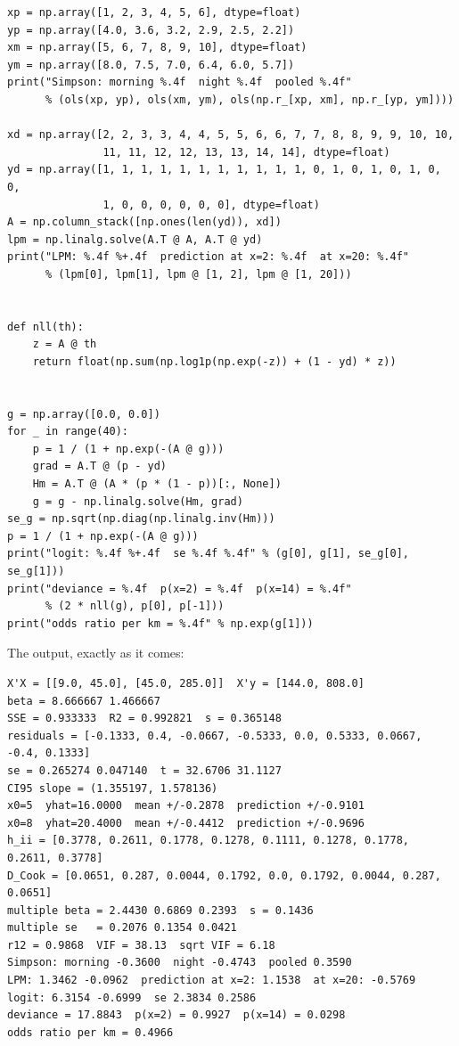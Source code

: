\begin{lab}
\begin{verbatim}
xp = np.array([1, 2, 3, 4, 5, 6], dtype=float)
yp = np.array([4.0, 3.6, 3.2, 2.9, 2.5, 2.2])
xm = np.array([5, 6, 7, 8, 9, 10], dtype=float)
ym = np.array([8.0, 7.5, 7.0, 6.4, 6.0, 5.7])
print("Simpson: morning %.4f  night %.4f  pooled %.4f"
      % (ols(xp, yp), ols(xm, ym), ols(np.r_[xp, xm], np.r_[yp, ym])))

xd = np.array([2, 2, 3, 3, 4, 4, 5, 5, 6, 6, 7, 7, 8, 8, 9, 9, 10, 10,
               11, 11, 12, 12, 13, 13, 14, 14], dtype=float)
yd = np.array([1, 1, 1, 1, 1, 1, 1, 1, 1, 1, 1, 0, 1, 0, 1, 0, 1, 0, 0,
               1, 0, 0, 0, 0, 0, 0], dtype=float)
A = np.column_stack([np.ones(len(yd)), xd])
lpm = np.linalg.solve(A.T @ A, A.T @ yd)
print("LPM: %.4f %+.4f  prediction at x=2: %.4f  at x=20: %.4f"
      % (lpm[0], lpm[1], lpm @ [1, 2], lpm @ [1, 20]))


def nll(th):
    z = A @ th
    return float(np.sum(np.log1p(np.exp(-z)) + (1 - yd) * z))


g = np.array([0.0, 0.0])
for _ in range(40):
    p = 1 / (1 + np.exp(-(A @ g)))
    grad = A.T @ (p - yd)
    Hm = A.T @ (A * (p * (1 - p))[:, None])
    g = g - np.linalg.solve(Hm, grad)
se_g = np.sqrt(np.diag(np.linalg.inv(Hm)))
p = 1 / (1 + np.exp(-(A @ g)))
print("logit: %.4f %+.4f  se %.4f %.4f" % (g[0], g[1], se_g[0], se_g[1]))
print("deviance = %.4f  p(x=2) = %.4f  p(x=14) = %.4f"
      % (2 * nll(g), p[0], p[-1]))
print("odds ratio per km = %.4f" % np.exp(g[1]))
\end{verbatim}
\end{lab}

The output, exactly as it comes:

\begin{verbatim}
X'X = [[9.0, 45.0], [45.0, 285.0]]  X'y = [144.0, 808.0]
beta = 8.666667 1.466667
SSE = 0.933333  R2 = 0.992821  s = 0.365148
residuals = [-0.1333, 0.4, -0.0667, -0.5333, 0.0, 0.5333, 0.0667, -0.4, 0.1333]
se = 0.265274 0.047140  t = 32.6706 31.1127
CI95 slope = (1.355197, 1.578136)
x0=5  yhat=16.0000  mean +/-0.2878  prediction +/-0.9101
x0=8  yhat=20.4000  mean +/-0.4412  prediction +/-0.9696
h_ii = [0.3778, 0.2611, 0.1778, 0.1278, 0.1111, 0.1278, 0.1778, 0.2611, 0.3778]
D_Cook = [0.0651, 0.287, 0.0044, 0.1792, 0.0, 0.1792, 0.0044, 0.287, 0.0651]
multiple beta = 2.4430 0.6869 0.2393  s = 0.1436
multiple se   = 0.2076 0.1354 0.0421
r12 = 0.9868  VIF = 38.13  sqrt VIF = 6.18
Simpson: morning -0.3600  night -0.4743  pooled 0.3590
LPM: 1.3462 -0.0962  prediction at x=2: 1.1538  at x=20: -0.5769
logit: 6.3154 -0.6999  se 2.3834 0.2586
deviance = 17.8843  p(x=2) = 0.9927  p(x=14) = 0.0298
odds ratio per km = 0.4966
\end{verbatim}

